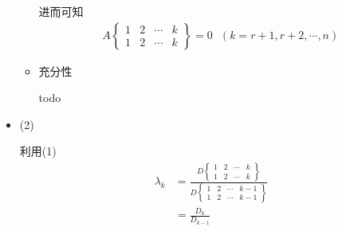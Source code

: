 \documentclass{article}
\begin{document}
\begin{itemize}
\begin{itemize}
                进而可知
                \begin{align*}
                  A \begin{Bmatrix}
                      1 & 2 & \cdots & k \\
                      1 & 2 & \cdots & k
                    \end{Bmatrix}
                  = 0 \ \ \ (k = r + 1, r + 2, \cdots, n)
                \end{align*}

          \item 充分性

                todo


        \end{itemize}
  \item (2)

        利用(1)
        \begin{align*}
          \lambda_k & = \frac{D \begin{Bmatrix}
                                    1 & 2 & \cdots & k \\
                                    1 & 2 & \cdots & k
                                  \end{Bmatrix}}{D \begin{Bmatrix}
                                                     1 & 2 & \cdots & k-1 \\
                                                     1 & 2 & \cdots & k-1
                                                   \end{Bmatrix}} \\
                    & =\frac{D_k}{D_{k-1}}
        \end{align*}
\end{itemize}
\end{document}
